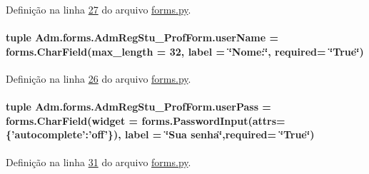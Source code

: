Definição na linha \hyperlink{Adm_2forms_8py_source_l00027}{27} do arquivo \hyperlink{Adm_2forms_8py_source}{forms.\-py}.

\hypertarget{classAdm_1_1forms_1_1AdmRegStu__ProfForm_a4e5391112a173e2d304e20c2cc8bca4d}{
\paragraph[{user\-Name}]{\setlength{\rightskip}{0pt plus 5cm}tuple Adm.\-forms.\-Adm\-Reg\-Stu\-\_\-\-Prof\-Form.\-user\-Name = forms.\-Char\-Field(max\-\_\-length = 32, label = \char`\"{}Nome\-:\char`\"{}, required= \char`\"{}True\char`\"{})\hspace{0.3cm}{\ttfamily [static]}}}\label{classAdm_1_1forms_1_1AdmRegStu__ProfForm_a4e5391112a173e2d304e20c2cc8bca4d}


Definição na linha \hyperlink{Adm_2forms_8py_source_l00026}{26} do arquivo \hyperlink{Adm_2forms_8py_source}{forms.\-py}.

\hypertarget{classAdm_1_1forms_1_1AdmRegStu__ProfForm_ad50fce73918c911541bd1c385d25eeca}{
\paragraph[{user\-Pass}]{\setlength{\rightskip}{0pt plus 5cm}tuple Adm.\-forms.\-Adm\-Reg\-Stu\-\_\-\-Prof\-Form.\-user\-Pass = forms.\-Char\-Field(widget = forms.\-Password\-Input(attrs=\{'autocomplete'\-:'off'\}), label = \char`\"{}Sua senha\char`\"{},required= \char`\"{}True\char`\"{})\hspace{0.3cm}{\ttfamily [static]}}}\label{classAdm_1_1forms_1_1AdmRegStu__ProfForm_ad50fce73918c911541bd1c385d25eeca}


Definição na linha \hyperlink{Adm_2forms_8py_source_l00031}{31} do arquivo \hyperlink{Adm_2forms_8py_source}{forms.\-py}.

